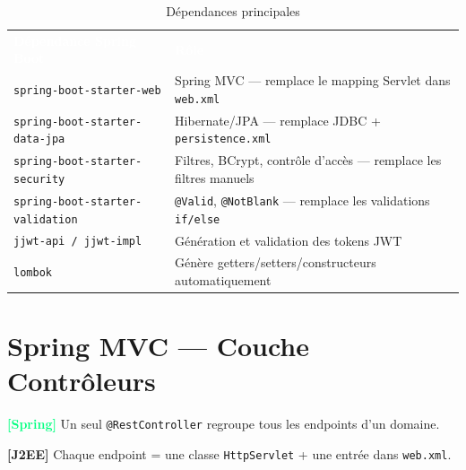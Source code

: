 \documentclass[11pt,a4paper]{article}
\newcommand{\spring}[1]{\textcolor{springgreen}{\textbf{[Spring]}} #1}
\newcommand{\jee}[1]{\textcolor{j2eered}{\textbf{[J2EE]}} #1}
\newcommand{\code}[1]{\texttt{\small #1}}
\newcommand{\theadrow}[2]{%
  \rowcolor{headerbg}\textcolor{white}{\textbf{#1}} & \textcolor{white}{\textbf{#2}}\\}
\begin{document}
\begin{table}[h!]
\centering
\renewcommand{\arraystretch}{1.35}
\begin{tabularx}{\linewidth}{L{4.8cm} X}
\theadrow{Dépendance Spring Boot}{Rôle}
\code{spring-boot-starter-web}       & Spring MVC — remplace le mapping Servlet dans \code{web.xml} \\
\code{spring-boot-starter-data-jpa}  & Hibernate/JPA — remplace JDBC + \code{persistence.xml} \\
\code{spring-boot-starter-security}  & Filtres, BCrypt, contrôle d'accès — remplace les filtres manuels \\
\code{spring-boot-starter-validation}& \code{@Valid}, \code{@NotBlank} — remplace les validations \code{if/else} \\
\code{jjwt-api / jjwt-impl}          & Génération et validation des tokens JWT \\
\code{lombok}                        & Génère getters/setters/constructeurs automatiquement \\
\bottomrule
\end{tabularx}
\caption{Dépendances principales}
\end{table}

\section{Spring MVC — Couche Contrôleurs}

\spring{Un seul \code{@RestController} regroupe tous les endpoints d'un domaine.}

\jee{Chaque endpoint = une classe \code{HttpServlet} + une entrée dans \code{web.xml}.}
\end{document}
